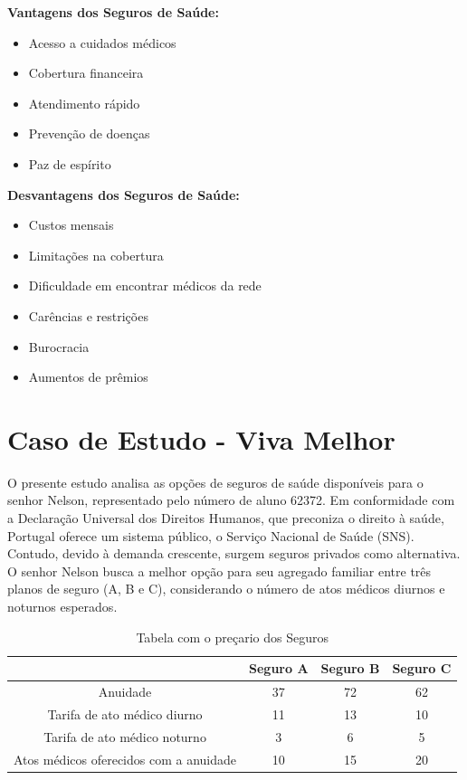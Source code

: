 \documentclass{report}
\begin{document}
\begin{minipage}{0.45\textwidth}
  \textbf{Vantagens dos Seguros de Saúde:}
  \begin{itemize}
    \item Acesso a cuidados médicos
    \item Cobertura financeira
    \item Atendimento rápido
    \item Prevenção de doenças
    \item Paz de espírito
  \end{itemize}
\end{minipage}%
\begin{minipage}{0.45\textwidth}
  \textbf{Desvantagens dos Seguros de Saúde:}
  \begin{itemize}
    \item Custos mensais
    \item Limitações na cobertura
    \item Dificuldade em encontrar médicos da rede
    \item Carências e restrições
    \item Burocracia
    \item Aumentos de prêmios
  \end{itemize}
\end{minipage}

\chapter{Caso de Estudo - Viva Melhor}

O presente estudo analisa as opções de seguros de saúde disponíveis para o senhor Nelson, representado pelo número de aluno 62372. Em conformidade com a Declaração Universal dos Direitos Humanos, que preconiza o direito à saúde, Portugal oferece um sistema público, o Serviço Nacional de Saúde (SNS). Contudo, devido à demanda crescente, surgem seguros privados como alternativa. O senhor Nelson busca a melhor opção para seu agregado familiar entre três planos de seguro (A, B e C), considerando o número de atos médicos diurnos e noturnos esperados.

\begin{table}[H]
  \centering
  \begin{tabular}{|c|c|c|c|}
    \hline
    & Seguro A & Seguro B & Seguro C \\
    \hline
    Anuidade & 37 & 72 & 62 \\ \hline
    Tarifa de ato médico diurno & 11 & 13 & 10 \\ \hline
    Tarifa de ato médico noturno & 3 & 6 & 5 \\ \hline
    Atos médicos oferecidos com a anuidade & 10 & 15 & 20 \\
    \hline
  \end{tabular}
  \caption{Tabela com o preçario dos Seguros}
\end{table}
\end{document}
